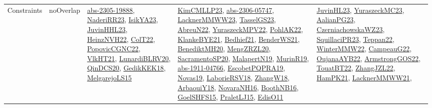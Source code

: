 {\begin{longtable}{lp{3cm}>{\raggedright}p{6cm}>{\raggedright}p{6cm}p{8cm}}
Constraints & noOverlap & \href{articles/abs-2305-19888.pdf}{abs-2305-19888}\cite{abs-2305-19888}, \href{articles/NaderiRR23.pdf}{NaderiRR23}\cite{NaderiRR23}, \href{articles/IsikYA23.pdf}{IsikYA23}\cite{IsikYA23}, \href{papers/JuvinHHL23.pdf}{JuvinHHL23}\cite{JuvinHHL23}, \href{articles/HeinzNVH22.pdf}{HeinzNVH22}\cite{HeinzNVH22}, \href{articles/ColT22.pdf}{ColT22}\cite{ColT22}, \href{papers/PopovicCGNC22.pdf}{PopovicCGNC22}\cite{PopovicCGNC22}, \href{articles/VlkHT21.pdf}{VlkHT21}\cite{VlkHT21}, \href{articles/LunardiBLRV20.pdf}{LunardiBLRV20}\cite{LunardiBLRV20}, \href{articles/QinDCS20.pdf}{QinDCS20}\cite{QinDCS20}, \href{articles/GedikKEK18.pdf}{GedikKEK18}\cite{GedikKEK18}, \href{papers/MelgarejoLS15.pdf}{MelgarejoLS15}\cite{MelgarejoLS15} & \href{papers/KimCMLLP23.pdf}{KimCMLLP23}\cite{KimCMLLP23}, \href{articles/abs-2306-05747.pdf}{abs-2306-05747}\cite{abs-2306-05747}, \href{articles/LacknerMMWW23.pdf}{LacknerMMWW23}\cite{LacknerMMWW23}, \href{papers/TasselGS23.pdf}{TasselGS23}\cite{TasselGS23}, \href{articles/AbreuN22.pdf}{AbreuN22}\cite{AbreuN22}, \href{articles/YuraszeckMPV22.pdf}{YuraszeckMPV22}\cite{YuraszeckMPV22}, \href{articles/PohlAK22.pdf}{PohlAK22}\cite{PohlAK22}, \href{papers/KlankeBYE21.pdf}{KlankeBYE21}\cite{KlankeBYE21}, \href{articles/Bedhief21.pdf}{Bedhief21}\cite{Bedhief21}, \href{papers/BenderWS21.pdf}{BenderWS21}\cite{BenderWS21}, \href{articles/BenediktMH20.pdf}{BenediktMH20}\cite{BenediktMH20}, \href{articles/MengZRZL20.pdf}{MengZRZL20}\cite{MengZRZL20}, \href{articles/SacramentoSP20.pdf}{SacramentoSP20}\cite{SacramentoSP20}, \href{papers/MalapertN19.pdf}{MalapertN19}\cite{MalapertN19}, \href{papers/MurinR19.pdf}{MurinR19}\cite{MurinR19}, \href{articles/abs-1911-04766.pdf}{abs-1911-04766}\cite{abs-1911-04766}, \href{articles/EscobetPQPRA19.pdf}{EscobetPQPRA19}\cite{EscobetPQPRA19}, \href{articles/Novas19.pdf}{Novas19}\cite{Novas19}, \href{articles/LaborieRSV18.pdf}{LaborieRSV18}\cite{LaborieRSV18}, \href{articles/ZhangW18.pdf}{ZhangW18}\cite{ZhangW18}, \href{papers/ArbaouiY18.pdf}{ArbaouiY18}\cite{ArbaouiY18}, \href{articles/NovaraNH16.pdf}{NovaraNH16}\cite{NovaraNH16}, \href{papers/BoothNB16.pdf}{BoothNB16}\cite{BoothNB16}, \href{articles/GoelSHFS15.pdf}{GoelSHFS15}\cite{GoelSHFS15}, \href{papers/PraletLJ15.pdf}{PraletLJ15}\cite{PraletLJ15}, \href{papers/EdisO11.pdf}{EdisO11}\cite{EdisO11} & \href{papers/JuvinHL23.pdf}{JuvinHL23}\cite{JuvinHL23}, \href{papers/YuraszeckMC23.pdf}{YuraszeckMC23}\cite{YuraszeckMC23}, \href{papers/AalianPG23.pdf}{AalianPG23}\cite{AalianPG23}, \href{articles/CzerniachowskaWZ23.pdf}{CzerniachowskaWZ23}\cite{CzerniachowskaWZ23}, \href{papers/SquillaciPR23.pdf}{SquillaciPR23}\cite{SquillaciPR23}, \href{papers/Teppan22.pdf}{Teppan22}\cite{Teppan22}, \href{papers/WinterMMW22.pdf}{WinterMMW22}\cite{WinterMMW22}, \href{articles/CampeauG22.pdf}{CampeauG22}\cite{CampeauG22}, \href{papers/OujanaAYB22.pdf}{OujanaAYB22}\cite{OujanaAYB22}, \href{papers/ArmstrongGOS22.pdf}{ArmstrongGOS22}\cite{ArmstrongGOS22}, \href{papers/TouatBT22.pdf}{TouatBT22}\cite{TouatBT22}, \href{papers/ZhangJZL22.pdf}{ZhangJZL22}\cite{ZhangJZL22}, \href{articles/HamPK21.pdf}{HamPK21}\cite{HamPK21}, \href{papers/LacknerMMWW21.pdf}{LacknerMMWW21}\cite{LacknerMMWW21}, 
\end{longtable}}
